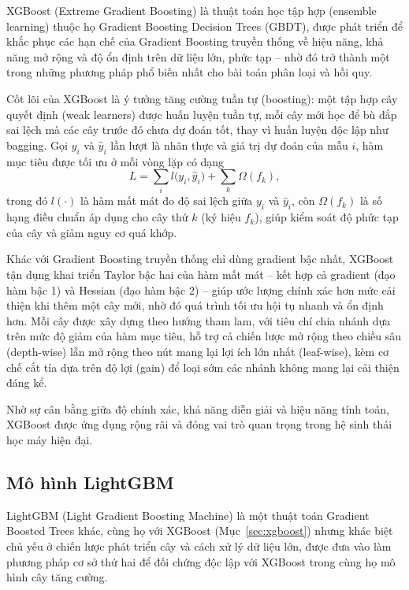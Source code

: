 \documentclass[10pt,twocolumn,twoside]{article}
\begin{document}
XGBoost (Extreme Gradient Boosting) là thuật toán học tập hợp (ensemble
learning) thuộc họ Gradient Boosting Decision Trees (GBDT), được phát triển
để khắc phục các
hạn chế của Gradient Boosting truyền thống về hiệu năng, khả năng mở rộng và
độ ổn định trên dữ liệu lớn, phức tạp -- nhờ đó trở thành một trong những
phương pháp phổ biến nhất cho bài toán phân loại và hồi quy.

Cốt lõi của XGBoost là ý tưởng tăng cường tuần tự (boosting): một tập hợp
cây quyết định (weak learners) được huấn luyện tuần tự, mỗi cây mới học để
bù đắp sai lệch mà các
cây trước đó chưa dự đoán tốt, thay vì huấn luyện độc lập như bagging. Gọi
$y_i$ và $\hat{y}_i$ lần lượt là nhãn thực và giá trị dự đoán của mẫu $i$,
hàm mục tiêu được tối ưu ở mỗi vòng lặp có dạng
\begin{equation}
L = \sum_i l\big(y_i, \hat{y}_i\big) + \sum_k \Omega(f_k),
\label{eq:xgb}
\end{equation}
trong đó $l(\cdot)$ là hàm mất mát đo độ sai lệch giữa $y_i$ và $\hat{y}_i$,
còn $\Omega(f_k)$ là số hạng điều chuẩn áp dụng cho cây thứ $k$ (ký hiệu
$f_k$), giúp kiểm soát độ phức tạp của cây và giảm nguy cơ quá khớp.

Khác với Gradient Boosting truyền thống chỉ dùng gradient bậc nhất, XGBoost
tận dụng khai triển Taylor bậc hai của hàm mất mát -- kết hợp cả gradient
(đạo hàm bậc 1) và Hessian (đạo hàm bậc 2) -- giúp ước lượng chính xác hơn
mức cải thiện khi thêm một cây mới, nhờ đó quá trình tối ưu hội tụ nhanh và
ổn định hơn. Mỗi cây được xây dựng theo hướng tham lam, với tiêu chí chia
nhánh dựa trên mức độ giảm của hàm mục tiêu, hỗ trợ cả chiến lược mở rộng
theo chiều sâu (depth-wise) lẫn mở rộng theo nút mang lại lợi ích lớn nhất
(leaf-wise), kèm cơ chế cắt tỉa dựa trên độ lợi (gain) để loại sớm các nhánh
không mang lại cải thiện đáng kể.

Nhờ sự cân bằng giữa độ chính xác, khả năng diễn giải và hiệu năng tính
toán, XGBoost được ứng dụng rộng rãi và đóng vai trò quan trọng trong hệ
sinh thái học máy hiện đại.

\subsection{Mô hình LightGBM}
\label{sec:lightgbm}

LightGBM (Light Gradient Boosting Machine) là một thuật toán Gradient
Boosted Trees khác, cùng họ với XGBoost (Mục~\ref{sec:xgboost}) nhưng khác
biệt chủ yếu ở chiến lược phát triển cây và cách xử lý dữ liệu lớn, được
đưa vào làm phương pháp cơ sở thứ hai để đối chứng độc lập với XGBoost trong
cùng họ mô hình cây tăng cường.
\end{document}
